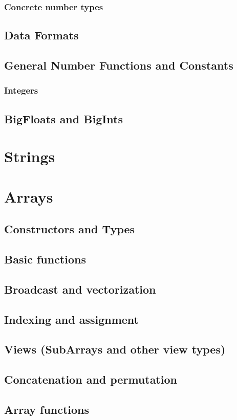     \subsection{Concrete number types}
    \section{Data Formats}
    \section{General Number Functions and Constants}
    \subsection{Integers}
    \section{BigFloats and BigInts}
  \chapter{Strings}
  \chapter{Arrays}
    \section{Constructors and Types}
    \section{Basic functions}
    \section{Broadcast and vectorization}
    \section{Indexing and assignment}
    \section{Views (SubArrays and other view types)}
    \section{Concatenation and permutation}
    \section{Array functions}
